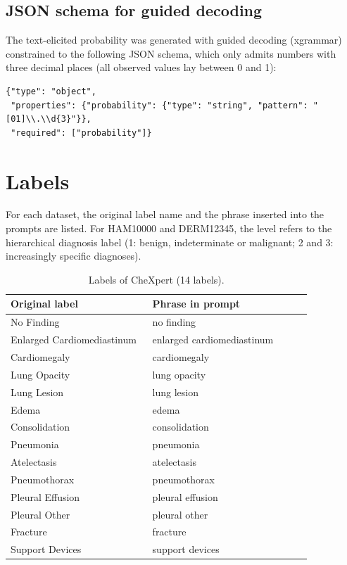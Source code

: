 \subsection{JSON schema for guided decoding}
The text-elicited probability was generated with guided decoding (xgrammar) constrained to the following JSON schema, which only admits numbers with three decimal places (all observed values lay between 0 and 1):
\begin{lstlisting}
{"type": "object",
 "properties": {"probability": {"type": "string", "pattern": "[01]\\.\\d{3}"}},
 "required": ["probability"]}
\end{lstlisting}

\section{Labels}\label{sec:labels}
For each dataset, the original label name and the phrase inserted into the prompts are listed. For HAM10000 and DERM12345, the level refers to the hierarchical diagnosis label (1: benign, indeterminate or malignant; 2 and 3: increasingly specific diagnoses).

\begin{table}[htbp]
\centering
\small
\caption{Labels of CheXpert (14 labels).}\label{tab:labels_CheXpert}
\begin{tabular}{p{0.4\linewidth}p{0.45\linewidth}}
\toprule
Original label & Phrase in prompt \\
\midrule
No Finding & no finding \\
Enlarged Cardiomediastinum & enlarged cardiomediastinum \\
Cardiomegaly & cardiomegaly \\
Lung Opacity & lung opacity \\
Lung Lesion & lung lesion \\
Edema & edema \\
Consolidation & consolidation \\
Pneumonia & pneumonia \\
Atelectasis & atelectasis \\
Pneumothorax & pneumothorax \\
Pleural Effusion & pleural effusion \\
Pleural Other & pleural other \\
Fracture & fracture \\
Support Devices & support devices \\
\bottomrule
\end{tabular}
\end{table}

